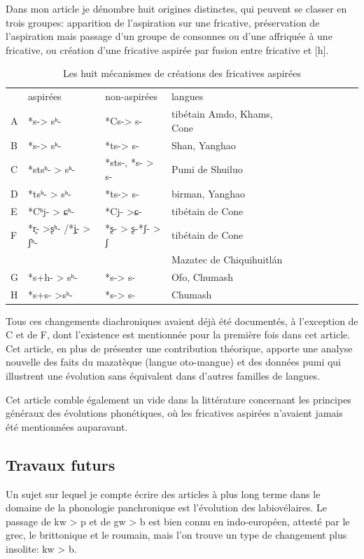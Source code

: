 \documentclass[oldfontcommands,oneside,a4paper,11pt]{memoir}
\begin{document}
Dans mon article je dénombre huit origines distinctes, qui peuvent se classer en trois groupes: apparition de l'aspiration sur une fricative, préservation de l'aspiration mais passage d'un groupe de consonnes ou d'une affriquée à une fricative, ou création d'une fricative aspirée par fusion entre fricative et [h].
\begin{table}[H]
\caption{Les huit mécanismes de créations des fricatives aspirées} \label{tab:aspirated fricatives}
\begin{tabular}{lllllllllll}  \toprule
 	&	aspirées	&	non-aspirées	&	langues	\\
A	&	*s-> sʰ-	&	*Cs-> s-	&	tibétain Amdo, Khams, Cone 	\\
B	&	*s-> sʰ-	&	*ts-> s-	&	Shan, Yanghao	\\
C	&	*stsʰ- > sʰ-	&	*sts-, *s- > s-	&	Pumi de Shuiluo 	\\
D	&	*tsʰ- > sʰ-	&	*ts-> s-	&	birman, Yanghao	\\
E	&	*Cʰj- > ɕʰ-	&	*Cj- >ɕ-	&	tibétain de Cone 	\\
F	&	*r̥- >ʂʰ- /*j̥- > ʃʰ-	&	*ʂ- > ʂ-*ʃ- > ʃ	&	tibétain de Cone \\

&&&Mazatec de Chiquihuitlán \\
G	&	*s+h- > sʰ-	&	*s-> s-	&	Ofo, Chumash	\\
H	&	*s+s- >sʰ-	&	*s-> s-	&	Chumash	\\
\bottomrule
\end{tabular}
\end{table}
Tous ces changements diachroniques avaient déjà été documentés, à l'exception de C et de F, dont l'existence est mentionnée pour la première fois dans cet article. Cet article, en plus de présenter une contribution théorique, apporte une analyse nouvelle des faits du mazatèque (langue oto-mangue) et des données pumi qui illustrent une évolution sans équivalent dans d'autres familles de langues.

Cet article comble également un vide dans la littérature concernant les principes généraux des évolutions phonétiques, où les fricatives aspirées n'avaient jamais été mentionnées auparavant.

\subsection{Travaux futurs}
Un sujet sur lequel je compte écrire des articles à plus long terme dans le domaine de la phonologie panchronique est l'évolution des labiovélaires. Le passage de kw > p et de gw > b est bien connu en indo-européen, attesté par le grec, le brittonique et le roumain, mais l'on trouve un type de changement plus insolite: kw > b.
\end{document}
